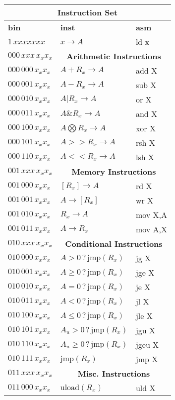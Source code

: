 \documentclass[11pt]{article}
\begin{document}
\begin{tabular}{|l | l | l |}
\hline
\multicolumn{3}{|c|}{ \textbf{Instruction Set}} \\
\hline
\textbf{bin} & \textbf{inst} & \textbf{asm}\\
\hline 
$1\,xxxxxxx$ & $x \rightarrow A$ & ld x  \\
\hline
$000\,xxx\,x_x x_x$&\multicolumn{2}{c|}{ \textbf{Arithmetic Instructions}} \\
\hline
$000\,000\,x_x x_x$ & $A + R_x \rightarrow A$ & add X \\
$000\,001\,x_x x_x$ & $A - R_x \rightarrow A$ & sub X \\
$000\,010\,x_x x_x$ & $A | R_x \rightarrow A$ & or X \\
$000\,011\, x_x x_x$ & $A \& R_x \rightarrow A$ & and X \\
$000\,100\, x_x x_x$ & $A \bigotimes R_x \rightarrow A$ & xor X \\
$000\,101\, x_x x_x$ & $A >> R_x \rightarrow A$ & rsh X \\
$000\,110\, x_x x_x$ & $A << R_x \rightarrow A$ & lsh X \\
\hline
$001\,xxx\,x_x x_x$&\multicolumn{2}{c|}{ \textbf{Memory Instructions}} \\
\hline
$001\,000\, x_x x_x$ & $[R_x] \rightarrow A$ & rd X \\
$001\,001\, x_x x_x$ & $A \rightarrow [R_x]$ & wr X \\
$001\,010\, x_x x_x$ & $R_x \rightarrow A$ & mov X,A \\
$001\,011\, x_x x_x$ & $A \rightarrow R_x$ & mov A,X \\
\hline
$010\,xxx\,x_x x_x$&\multicolumn{2}{c|}{ \textbf{Conditional Instructions}} \\
\hline
$010\,000\, x_x x_x$ & $A > 0 \,?\, \mathrm{jmp}(R_x)$ & jg X \\
$010\,001\, x_x x_x$ & $A \geq 0 \,?\, \mathrm{jmp}(R_x)$ & jge X \\
$010\,010\, x_x x_x$ & $A = 0 \,?\, \mathrm{jmp}(R_x)$ & je X \\
$010\,011\, x_x x_x$ & $A < 0 \,?\, \mathrm{jmp}(R_x)$ & jl X \\
$010\,100\, x_x x_x$ & $A \leq 0 \,?\, \mathrm{jmp}(R_x)$ & jle X \\
$010\,101\, x_x x_x$ & $A_u > 0 \,?\, \mathrm{jmp}(R_x)$ & jgu X \\
$010\,110\, x_x x_x$ & $A_u \geq 0 \,?\, \mathrm{jmp}(R_x)$ & jgeu X \\
$010\,111\, x_x x_x$ & $\mathrm{jmp}(R_x)$ & jmp X \\
\hline
$011\,xxx\,x_x x_x$&\multicolumn{2}{c|}{ \textbf{Misc. Instructions}} \\
\hline
$011\,000\, x_x x_x$ & $\mathrm{uload}(R_x)$ & uld X \\
\hline
\end{tabular}
\end{document}
